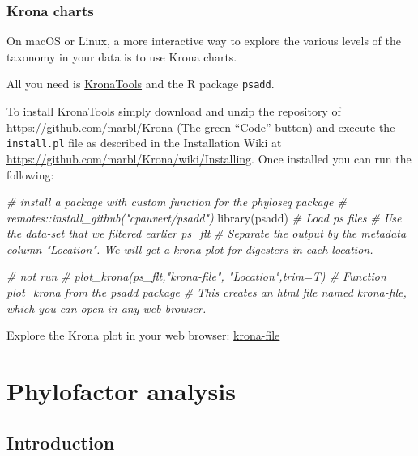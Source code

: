 \documentclass[
]{book}
\newenvironment{Shaded}{\begin{snugshade}}{\end{snugshade}}
\newcommand{\CommentTok}[1]{\textcolor[rgb]{0.56,0.35,0.01}{\textit{#1}}}
\newcommand{\FunctionTok}[1]{\textcolor[rgb]{0.00,0.00,0.00}{#1}}
\newcommand{\NormalTok}[1]{#1}
\begin{document}
\hypertarget{krona-charts}{%
\subsection{Krona charts}\label{krona-charts}}

On macOS or Linux, a more interactive way to explore the various levels of the taxonomy in your data is to use Krona charts.

All you need is \href{https://github.com/marbl/Krona/wiki/KronaTools}{KronaTools} and the R package \texttt{psadd}.

To install KronaTools simply download and unzip the repository of \url{https://github.com/marbl/Krona} (The green ``Code'' button) and execute the \texttt{install.pl} file as described in the Installation Wiki at \url{https://github.com/marbl/Krona/wiki/Installing}. Once installed you can run the following:

\begin{Shaded}
\begin{Highlighting}[]
\CommentTok{\# install a package with custom function for the phyloseq package}
\CommentTok{\# remotes::install\_github("cpauvert/psadd")}
\FunctionTok{library}\NormalTok{(psadd)}
\CommentTok{\# Load ps files }
\CommentTok{\# Use the data{-}set that we filtered earlier \textquotesingle{}ps\_flt\textquotesingle{}}
\CommentTok{\# Separate the output by the metadata column "Location". We will get a krona plot for digesters in each location.}

\CommentTok{\# not run}
\CommentTok{\# plot\_krona(ps\_flt,"krona{-}file", "Location",trim=T) \# Function plot\_krona from the psadd package}
\CommentTok{\# This creates an \textquotesingle{}html\textquotesingle{} file named \textquotesingle{}krona{-}file, which you can open in any web browser. }
\end{Highlighting}
\end{Shaded}

Explore the Krona plot in your web browser: \href{./krona-file/krona-file.html}{krona-file}

\hypertarget{phylofactor}{%
\chapter{Phylofactor analysis}\label{phylofactor}}

\hypertarget{introduction-5}{%
\section{Introduction}\label{introduction-5}}
\end{document}
